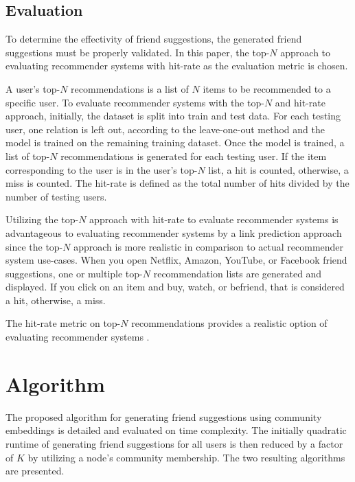 \documentclass[conference]{IEEEtran}
\begin{document}
\subsection{Evaluation}

To determine the effectivity of friend suggestions, the generated friend suggestions must be properly validated. In this paper, the top-$N$ approach to evaluating recommender systems with hit-rate as the evaluation metric is chosen.

A user's top-$N$ recommendations is a list of $N$ items to be recommended to a specific user. To evaluate recommender systems with the top-$N$ and hit-rate approach, initially, the dataset is split into train and test data. For each testing user, one relation is left out, according to the leave-one-out method and the model is trained on the remaining training dataset. Once the model is trained, a list of top-$N$ recommendations is generated for each testing user. If the item corresponding to the user is in the user's top-$N$ list, a hit is counted, otherwise, a miss is counted. The hit-rate is defined as the total number of hits divided by the number of testing users.

Utilizing the top-$N$ approach with hit-rate to evaluate recommender systems is advantageous to evaluating recommender systems by a link prediction approach since the top-$N$ approach is more realistic in comparison to actual recommender system use-cases. When you open Netflix, Amazon, YouTube, or Facebook friend suggestions, one or multiple top-$N$ recommendation lists are generated and displayed. If you click on an item and buy, watch, or befriend, that is considered a hit, otherwise, a miss.

The hit-rate metric on top-$N$ recommendations provides a realistic option of evaluating recommender systems \cite{Cremonesi2010PerformanceOR, Palumbo2017entity2rec, Zhao2019ATS}.


\section{Algorithm}

The proposed algorithm for generating friend suggestions using community embeddings is detailed and evaluated on time complexity. The initially quadratic runtime of generating friend suggestions for all users is then reduced by a factor of $K$ by utilizing a node's community membership. The two resulting algorithms are presented.
\end{document}
